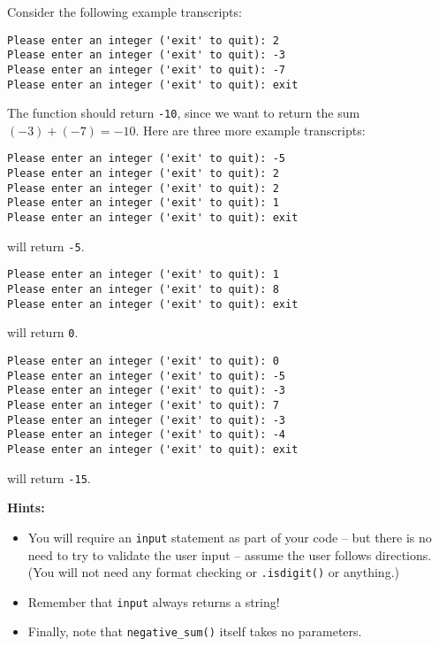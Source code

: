 \documentclass{article}
\begin{document}
\begin{enumerate}
    Consider the following example transcripts:

\begin{verbatim}
Please enter an integer ('exit' to quit): 2
Please enter an integer ('exit' to quit): -3
Please enter an integer ('exit' to quit): -7
Please enter an integer ('exit' to quit): exit
\end{verbatim}
The function should return \verb|-10|, since we want to return the sum  $(-3) + (-7) = -10$.  Here are three more example transcripts:

\begin{verbatim}
Please enter an integer ('exit' to quit): -5
Please enter an integer ('exit' to quit): 2
Please enter an integer ('exit' to quit): 2
Please enter an integer ('exit' to quit): 1
Please enter an integer ('exit' to quit): exit
\end{verbatim}
will return \verb|-5|.

\begin{verbatim}
Please enter an integer ('exit' to quit): 1
Please enter an integer ('exit' to quit): 8
Please enter an integer ('exit' to quit): exit
\end{verbatim}
will return \verb|0|.

\begin{verbatim}
Please enter an integer ('exit' to quit): 0
Please enter an integer ('exit' to quit): -5
Please enter an integer ('exit' to quit): -3
Please enter an integer ('exit' to quit): 7
Please enter an integer ('exit' to quit): -3
Please enter an integer ('exit' to quit): -4
Please enter an integer ('exit' to quit): exit
\end{verbatim}
will return \verb|-15|.

\textbf{Hints:}
\begin{itemize}
  \item You will require an \verb|input| statement as part of your
    code -- but there is no need to try to validate the user input --
    assume the user follows directions. (You will not need any format checking or \verb|.isdigit()| or anything.)
  \item Remember that \texttt{input} always returns a string!
  \item Finally, note that \verb|negative_sum()| itself takes no parameters.

\end{itemize}




\end{enumerate}
\end{document}
